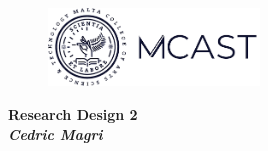 \begin{titlepage}

\begin{figure}[h!]
\centering
\includegraphics[width=0.5\textwidth, right]{Figures/logo.png}
\caption*{}
\label{fig:entropy} 
\end{figure}

\vspace{0.5in}

\centering
\Huge{\textbf{Research Design 2}}\\[2.0in]

\large{\textit{\textbf{Cedric Magri}}} \\[0.2in]

\vspace{1.5in}


\end{titlepage}
\newpage